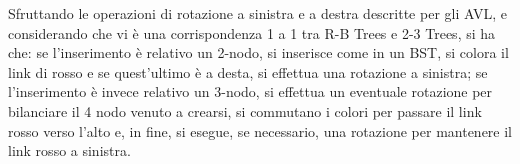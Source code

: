 \documentclass{subfiles}
\begin{document}
Sfruttando le operazioni di rotazione a sinistra e a destra descritte per gli AVL, e considerando che vi è una corrispondenza 1 a 1 tra R-B Trees e 2-3 Trees,
si ha che: se l'inserimento è relativo un 2-nodo, si inserisce come in un BST, si colora il link di rosso e se quest'ultimo è a desta, si effettua una rotazione a sinistra;
se l'inserimento è invece relativo un 3-nodo, si effettua un eventuale rotazione per bilanciare il 4 nodo venuto a crearsi,
si commutano i colori per passare il link rosso verso l'alto e, in fine, si esegue, se necessario, una rotazione per mantenere il link rosso a sinistra.
\end{document}
